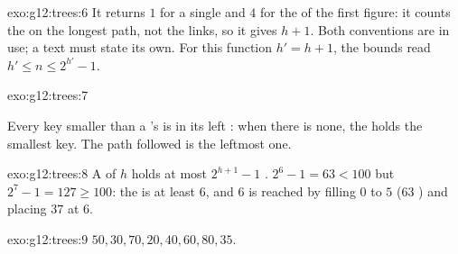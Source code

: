 \begin{solution}{exo:g12:trees:6}
It returns $1$ for a single  and $4$ for the  of the first figure: it counts the  on the longest path,
not the links, so it gives $h + 1$. Both conventions are in use; a text must state its own. For this function
$h' = h + 1$, the bounds read $h' \le n \le 2^{h'} - 1$.
\end{solution}

\begin{solution}{exo:g12:trees:7}
\smallskip\noindent\hspace*{2em}

\noindent\hspace*{4em}

\noindent\hspace*{6em}

\noindent\hspace*{4em}

\smallskip\noindent Every key smaller than a 's is in its left : when there is none, the  holds the
smallest key. The path followed is the leftmost one.
\end{solution}

\begin{solution}{exo:g12:trees:8}
A  of  $h$ holds at most $2^{h+1} - 1$ . $2^6 - 1 = 63 < 100$ but $2^7 - 1 = 127 \ge 100$: the  is
at least $6$, and $6$ is reached by filling  $0$ to $5$ ($63$ ) and placing $37$  at  $6$.
\end{solution}

\begin{solution}{exo:g12:trees:9}
$50, 30, 70, 20, 40, 60, 80, 35$.
\end{solution}

